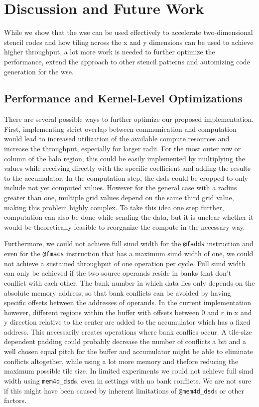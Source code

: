 \chapter{Discussion and Future Work}
While we show that the \ac{wse} can be used effectively to accelerate two-dimensional stencil codes and how tiling across the x and y dimensions can be used to achieve higher throughput, a lot more work is needed to further optimize the performance, extend the approach to other stencil patterns and automizing code generation for the \ac{wse}.

\section{Performance and Kernel-Level Optimizations}
There are several possible ways to further optimize our proposed implementation.
First, implementing strict overlap between communication and computation would lead to increased utilization of the available compute resources and increase the throughput, especially for larger radii.
For the most outer row or column of the halo region, this could be easily implemented by multiplying the values while receiving directly with the specific coefficient and adding the results to the accumulator. In the computation step, the \acp{dsd} could be cropped to only include not yet computed values. However for the general case with a radius greater than one, multiple grid values depend on the same third grid value, making this problem highly complex. To take this idea one step further, computation can also be done while sending the data, but it is unclear whether it would be theoretically feasible to reorganize the compute in the necessary way.

Furthermore, we could not achieve  full \ac{simd} width for the \texttt{@fadds} instruction and even for the \texttt{@fmacs} instruction that has a maximum \ac{simd} width of one, we could not achieve a sustained throughput of one operation per cycle. Full \ac{simd} width can only be achieved if the two source operands reside in banks that don't conflict with each other. The bank number in which data lies only depends on the absolute memory address, so that bank conflicts can be avoided by having specific offsets between the addresses of operands. In the current implementation however, different regions within the buffer with offsets between 0 and $r$ in x and y direction relative to the center are added to the accumulator which has a fixed address. This necessarily creates operations where bank conflics occur. A tile-size dependent padding could probably decrease the number of conflicts a bit and a well chosen equal pitch for the buffer and accumulator might be able to eliminate conflicts altogether, while using a lot more memory and thefore reducing the maximum possible tile size. In limited experiments we could not achieve  full \ac{simd} width using \texttt{mem4d\_dsd}s, even in settings with no bank conflicts. We are not sure if this might have been caused by inherent limitations of \texttt{@mem4d\_dsd}s or other factors.

